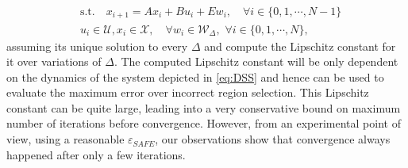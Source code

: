 {\begin{align*}
&\text{s.t.} \quad x_{i+1}=Ax_i+Bu_i + E w_i, \quad\forall i\in\{0,1,\cdots,N-1\}\nonumber\\
&u_i\in\mathcal{U},x_i\in\mathcal{X},\quad \forall w_i\in\mathcal{W}_{\Delta},\,\,\forall i\in\{0,1,\cdots,N\},
\end{align*}
 assuming its unique solution to every $\Delta$ and compute the Lipschitz constant for it over variations of $\Delta$. The computed Lipschitz constant will be only dependent on the dynamics of the system depicted in \autoref{eq:DSS} and hence can be used to evaluate the maximum error over incorrect region selection. This Lipschitz constant can be quite large, leading into a very conservative bound on maximum number of iterations before convergence. However, from an experimental point of view, using a reasonable $\varepsilon_{SAFE}$, our observations show that convergence always happened after only a few iterations.
}

